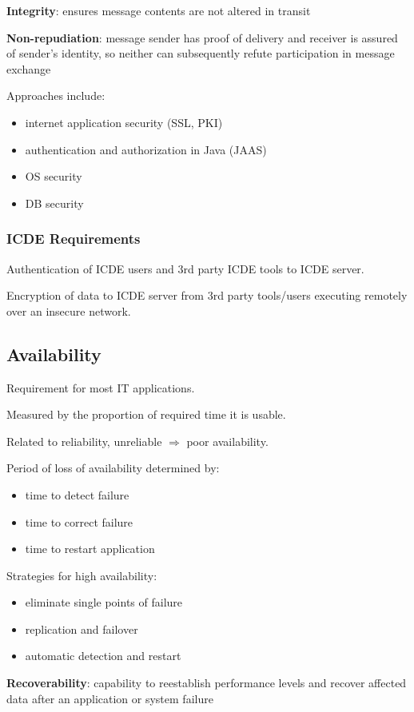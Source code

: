 \documentclass[11pt]{article}
\begin{document}
\textbf{Integrity}: ensures message contents are not altered in transit

\textbf{Non-repudiation}: message sender has proof of delivery and receiver is assured of sender's identity,
so neither can subsequently refute participation in message exchange

Approaches include:
\begin{itemize}
\item internet application security (SSL, PKI)
\item authentication and authorization in Java (JAAS)
\item OS security
\item DB security
\end{itemize}
\subsubsection{ICDE Requirements}
\label{sec:orga12c1bb}
Authentication of ICDE users and 3rd party ICDE tools to ICDE server.

Encryption of data to ICDE server from 3rd party tools/users executing remotely over
an insecure network.
\subsection{Availability}
\label{sec:orged32bd6}
Requirement for most IT applications.

Measured by the proportion of required time it is usable.

Related to reliability, unreliable \(\Rightarrow\) poor availability.

Period of loss of availability determined by:
\begin{itemize}
\item time to detect failure
\item time to correct failure
\item time to restart application
\end{itemize}

Strategies for high availability:
\begin{itemize}
\item eliminate single points of failure
\item replication and failover
\item automatic detection and restart
\end{itemize}

\textbf{Recoverability}: capability to reestablish performance levels and recover affected data after an
application or system failure
\end{document}
